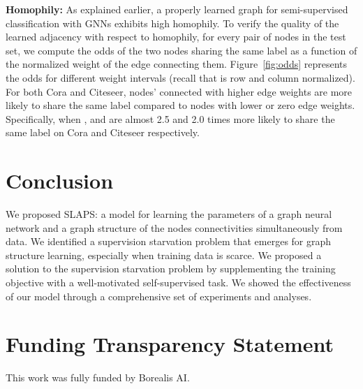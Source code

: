 \documentclass{article}
\begin{document}
\textbf{Homophily:} 
As explained earlier, a properly learned graph for semi-supervised classification with GNNs exhibits high homophily.
To verify the quality of the learned adjacency with respect to homophily, for every pair of nodes in the test set, we compute the odds of the two nodes sharing the same label as a function of the normalized weight of the edge connecting them. Figure~\ref{fig:odds} represents the odds for different weight intervals (recall that  is row and column normalized). For both Cora and Citeseer, nodes' connected with higher edge weights are more likely to share the same label compared to nodes with lower or zero edge weights. Specifically, when ,  and  are almost 2.5 and 2.0 times more likely to share the same label on Cora and Citeseer respectively.

\section{Conclusion}
We proposed SLAPS: a model for learning the parameters of a graph neural network and a graph structure of the nodes connectivities simultaneously from data. We identified a supervision starvation problem that emerges for graph structure learning, especially when training data is scarce. We proposed a solution to the supervision starvation problem by supplementing the training objective with a well-motivated self-supervised task. We showed the effectiveness of our model through a comprehensive set of experiments and analyses.

\section{Funding Transparency Statement} 
This work was fully funded by Borealis AI.




\appendix
\end{document}
